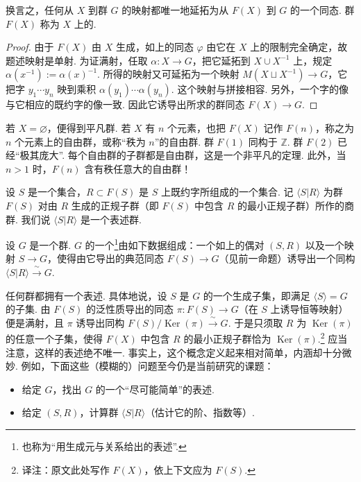 换言之，任何从 $X$ 到群 $G$ 的映射都唯一地延拓为从 $F(X)$ 到 $G$ 的一个同态. 群 $F(X)$ 称为 $X$ 上的.
\begin{proof}
由于 $F(X)$ 由 $X$ 生成，如上的同态 $\varphi$ 由它在 $X$ 上的限制完全确定，故题述映射是单射. 为证满射，任取 $\alpha:X\longrightarrow G$，把它延拓到 $X\cup X^{-1}$ 上，规定 $\alpha(x^{-1}):=\alpha(x)^{-1}$. 所得的映射又可延拓为一个映射 $M(X\sqcup X^{-1})\longrightarrow G$，它把字 $y_1\cdots y_n$ 映到乘积 $\alpha(y_1)\cdots\alpha(y_n)$. 这个映射与拼接相容. 另外，一个字的像与它相应的既约字的像一致. 因此它诱导出所求的群同态 $F(X)\longrightarrow G$.
\end{proof}
\begin{numpara}[例]\label{np:fg-2-3-2}
若 $X=\varnothing$，便得到平凡群. 若 $X$ 有 $n$ 个元素，也把 $F(X)$ 记作 $F(n)$，称之为 $n$ 个元素上的自由群，或称``秩为 $n$''的自由群. 群 $F(1)$ 同构于 $\mathbb{Z}$. 群 $F(2)$ 已经``极其庞大''. 每个自由群的子群都是自由群，这是一个非平凡的定理. 此外，当 $n>1$ 时，$F(n)$ 含有秩任意大的自由群！
\end{numpara}
\begin{numpara}[群的表述]\label{np:fg-2-3-3}
设 $S$ 是一个集合，$R\subset F(S)$ 是 $S$ 上既约字所组成的一个集合. 记 $\langle S|R\rangle$ 为群 $F(S)$ 对由 $R$ 生成的正规子群（即 $F(S)$ 中包含 $R$ 的最小正规子群）所作的商群. 我们说 $\langle S|R\rangle$ 是一个表述群.
\end{numpara}
\begin{definition*}
设 $G$ 是一个群. $G$ 的一个\footnote{也称为``用生成元与关系给出的表述''.}由如下数据组成：一个如上的偶对 $(S,R)$ 以及一个映射 $S\longrightarrow G$，使得由它导出的典范同态 $F(S)\longrightarrow G$（见前一命题）诱导出一个同构 $\langle S|R\rangle\xrightarrow{\ \sim\ }G$.
\end{definition*}
任何群都拥有一个表述. 具体地说，设 $S$ 是 $G$ 的一个生成子集，即满足 $\langle S\rangle=G$ 的子集. 由 $F(S)$ 的泛性质导出的同态 $\pi:F(S)\to G$（在 $S$ 上诱导恒等映射）便是满射，且 $\pi$ 诱导出同构 $F(S)/\operatorname{Ker}(\pi)\xrightarrow{\ \sim\ }G$. 于是只须取 $R$ 为 $\operatorname{Ker}(\pi)$ 的任意一个子集，使得 $F(X)$ 中包含 $R$ 的最小正规子群恰为 $\operatorname{Ker}(\pi)$.\footnote{译注：原文此处写作 $F(X)$，依上下文应为 $F(S)$.}
应当注意，这样的表述绝不唯一. 事实上，这个概念定义起来相对简单，内涵却十分微妙. 例如，下面这些（模糊的）问题至今仍是当前研究的课题：
\begin{itemize}
\item 给定 $G$，找出 $G$ 的一个``尽可能简单''的表述.
\item 给定 $(S,R)$，计算群 $\langle S|R\rangle$（估计它的阶、指数等）.
\end{itemize}

